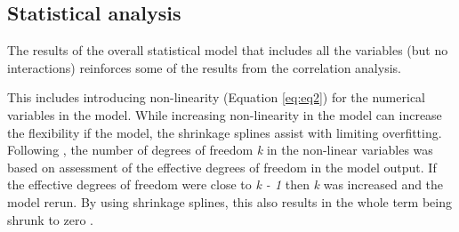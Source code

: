 \documentclass[]{elsarticle} %
\begin{document}
\hypertarget{statistical-analysis}{%
\subsection{Statistical analysis}\label{statistical-analysis}}

The results of the overall statistical model that includes all the variables (but no interactions) reinforces some of the results from the correlation analysis.

This includes introducing non-linearity (Equation \eqref{eq:eq2}) for the numerical variables in the model. While increasing non-linearity in the model can increase the flexibility if the model, the shrinkage splines assist with limiting overfitting. Following \citet{wood2006}, the number of degrees of freedom \emph{k} in the non-linear variables was based on assessment of the effective degrees of freedom in the model output. If the effective degrees of freedom were close to \emph{k - 1} then \emph{k} was increased and the model rerun. By using shrinkage splines, this also results in the whole term being shrunk to zero \citep{wood2006}.
\end{document}
